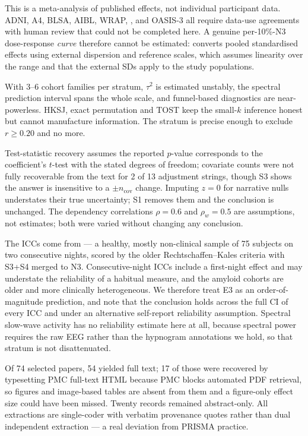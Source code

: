  This is a meta-analysis of published effects, not individual
participant data. ADNI, A4, BLSA, AIBL, WRAP, \mayo, \agewell and OASIS-3 all require data-use
agreements with human review that could not be completed here. A genuine per-10\%-N3
dose-response \emph{curve} therefore cannot be estimated:  converts pooled
standardised effects using external dispersion and reference scales, which assumes linearity
over the range and that the external SDs apply to the study populations.

 With 3--6 cohort families per stratum, $\tau^2$ is estimated unstably, the spectral
prediction interval spans the whole scale, and funnel-based diagnostics are near-powerless. HKSJ,
exact permutation and TOST keep the small-$k$ inference honest but cannot manufacture
information. The \stage stratum is precise enough to exclude $r \geq 0.20$ and no more.

 Test-statistic recovery assumes the reported $p$-value
corresponds to the coefficient's $t$-test with the stated degrees of freedom; covariate counts
were not fully recoverable from the text for 2 of 13 adjustment strings, though S3 shows the
answer is insensitive to a $\pm n_{\mathrm{cov}}$ change. Imputing $z = 0$ for narrative nulls
understates their true uncertainty; S1 removes them and the conclusion is unchanged. The
dependency correlations $\rho = 0.6$ and $\rho_w = 0.5$ are assumptions, not estimates; both
were varied without changing any conclusion.

 The ICCs come from \sleepedf --- a healthy, mostly non-clinical
sample of 75 subjects on two consecutive nights, scored by the older Rechtschaffen--Kales
criteria with S3+S4 merged to N3. Consecutive-night ICCs include a first-night effect and may
understate the reliability of a habitual measure, and the amyloid cohorts are older and more
clinically heterogeneous. We therefore treat E3 as an order-of-magnitude prediction, and note
that the conclusion holds across the full CI of every ICC and under an alternative self-report
reliability assumption. Spectral slow-wave activity has no reliability estimate here at all,
because spectral power requires the raw EEG rather than the hypnogram annotations we hold, so
that stratum is not disattenuated.

 Of 74 selected papers, 54 yielded full text; 17 of those were
recovered by typesetting PMC full-text HTML because PMC blocks automated PDF retrieval, so
figures and image-based tables are absent from them and a figure-only effect size could have
been missed. Twenty records remained abstract-only. All extractions are single-coder with
verbatim provenance quotes rather than dual independent extraction --- a real deviation from
PRISMA practice.

